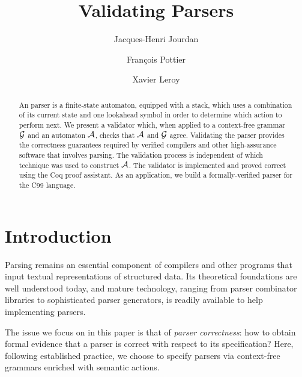 \documentclass{llncs}
\begin{document}
\title{Validating \lrone Parsers}
\author{Jacques-Henri Jourdan
        \and François Pottier
        \and Xavier Leroy}

\maketitle

\begin{abstract}
An \lrone parser is a finite-state automaton, equipped with a stack, which
uses a combination of its current state and one lookahead symbol in order to
determine which action to perform next.
We present a validator which,
when applied to a context-free grammar $\mathcal{G}$ and an automaton $\mathcal{A}$, checks that
$\mathcal{A}$ and $\mathcal{G}$ agree.
Validating the
parser provides the correctness guarantees required by verified
compilers and other high-assurance software that involves parsing.
The validation process is independent of which technique was used to
construct $\mathcal{A}$. The validator is implemented and proved correct using
the Coq proof assistant. As an application, we build a
formally-verified parser for the C99 language.
\end{abstract}


\section{Introduction}

Parsing remains an essential component of compilers and other programs
that input textual representations of structured data.  Its
theoretical foundations are well understood today, and mature
technology, ranging from parser combinator libraries to sophisticated
parser generators, is readily available to help implementing parsers.  

The issue we focus on in this paper is that of {\em parser correctness\/}:
how to obtain formal evidence that a parser is correct with respect to
its specification?  Here, following established practice, we choose to
specify parsers via context-free grammars enriched with semantic
actions.
\end{document}

